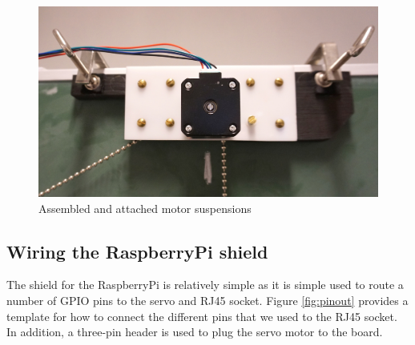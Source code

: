 \documentclass[a4paper,10pt]{article}
\begin{document}
\begin{figure}[h!]
  \centering
  \includegraphics{img/motorsusp.jpg}
  \caption{Assembled and attached motor suspensions}
  \label{fig:gondola}
\end{figure}

\subsection{Wiring the RaspberryPi shield}

The shield for the RaspberryPi is relatively simple as it is simple used to route a number of GPIO pins to the servo and RJ45 socket. Figure \ref{fig:pinout} provides a template for how to connect the different pins that we used to the RJ45 socket. In addition, a three-pin header is used to plug the servo motor to the board. 
\end{document}
